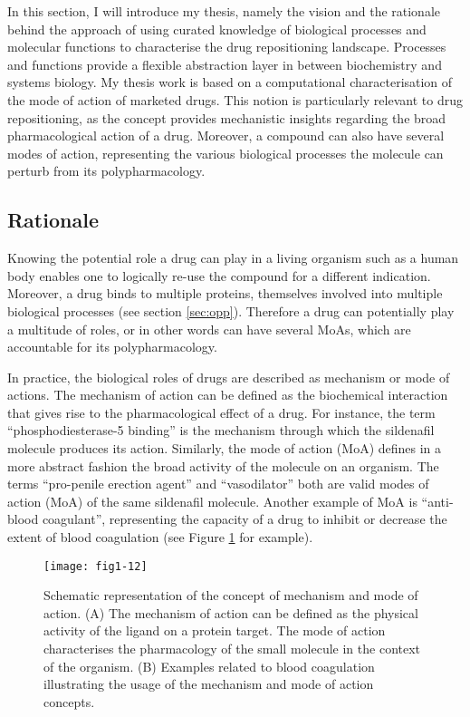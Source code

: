 In this section, I will introduce my thesis, namely the vision and the rationale behind the approach of using curated knowledge of biological processes and molecular functions to characterise the drug repositioning landscape. Processes and functions provide a flexible abstraction layer in between biochemistry and systems biology. My thesis work is based on a computational characterisation of the mode of action of marketed drugs. This notion is particularly relevant to drug repositioning, as the concept provides mechanistic insights regarding the broad pharmacological action of a drug. Moreover, a compound can also have several modes of action, representing the various biological processes the molecule can perturb from its polypharmacology.

\subsection{Rationale}

Knowing the potential role a drug can play in a living organism such as a human body enables one to logically re-use the compound for a different indication. Moreover, a drug binds to multiple proteins, themselves involved into multiple biological processes (see section \ref{sec:opp}). Therefore a drug can potentially play a multitude of roles, or in other words can have several MoAs, which are accountable for its polypharmacology.

In practice, the biological roles of drugs are described as mechanism or mode of actions. The mechanism of action can be defined as the biochemical interaction that gives rise to the pharmacological effect of a drug. For instance, the term “phosphodiesterase-5 binding” is the mechanism through which the sildenafil molecule produces its action. Similarly, the mode of action (MoA) defines in a more abstract fashion the broad activity of the molecule on an organism. The terms “pro-penile erection agent” and “vasodilator” both are valid modes of action (MoA) of the same sildenafil molecule. Another example of MoA is “anti-blood coagulant”, representing the capacity of a drug to inhibit or decrease the extent of blood coagulation (see Figure \ref{fig1-12} for example).

\begin{figure}[ht]
    \centering
    \texttt{[image: fig1-12]}
    \caption{Schematic representation of the concept of mechanism and mode of action. (A) The mechanism of action can be defined as the physical activity of the ligand on a protein target. The mode of action characterises the pharmacology of the small molecule in the context of the organism. (B) Examples related to blood coagulation illustrating the usage of the mechanism and mode of action concepts.}
    \label{fig1-12}
\end{figure}

